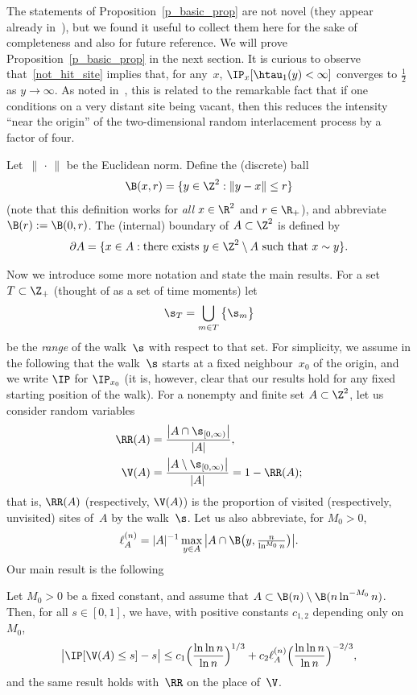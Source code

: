 The statements of Proposition~\ref{p_basic_prop} are not novel (they appear already in~\cite{CPV16}), but we found it useful to collect them here for the sake of completeness and also for future reference. We will prove Proposition~\ref{p_basic_prop} in the next section. It is curious to observe that~\eqref{not_hit_site} implies that, for any~$x$, $\IP_x[\htau_1(y)<\infty]$ converges to $\frac{1}{2}$ as $y\to \infty$. As noted in~\cite{CPV16}, this is related to the remarkable fact that if one conditions on a very distant site being vacant, then this reduces the intensity ``near the origin'' of the two-dimensional random interlacement process by a factor of four.

Let~$\|{\,\cdot\,}\|$ be the Euclidean norm. Define the (discrete) ball
\[
\B(x,r) = \{y\in \Z^2: \|y-x\|\leq r\}
\]
(note that this definition works for \emph{all} $x\in\R^2$ and $r\in\R_+$), and abbreviate $\B(r):=\B(0,r)$. The (internal) boundary of $A\subset\Z^2$ is defined by
\[
\partial A = \{x\in A: \text{there exists }y\in \Z^2\setminus A
\text{ such that }x\sim y\}.
\]

Now we introduce some more notation and state the main results. For a set $T\subset\Z_+$ (thought of as a set of time moments) let
\[
\s_T=\bigcup_{m\in T}\big\{\s_m\big\}
\]
be the \emph{range} of the walk~$\s$ with respect to that set. For simplicity, we assume in the following that the walk~$\s$ starts at a fixed neighbour~$x_0$ of the origin, and we write $\IP$ for $\IP_{x_0}$ (it is, however, clear that our results hold for any fixed starting position of the walk). For a nonempty and finite set $A\subset \Z^2$, let us consider random variables
\begin{align*}
\RR(A) &= \frac{\big|A\cap \s_{[0,\infty)}\big|}{|A|},\\
\V(A) &= \frac{\big|A\setminus \s_{[0,\infty)}\big|}{|A|} = 1-\RR(A);
\end{align*}
that is, $\RR(A)$ (respectively, $\V(A)$) is the proportion of visited (respectively, unvisited) sites of~$A$ by the walk~$\s$. Let us also abbreviate, for $M_0 > 0$,
\begin{equation}\label{df_ell_A}
\ell^{(n)}_A= |A|^{-1}
\max_{y\in A}
\big|A\cap \B\big(y,{\tfrac{n}{\ln^{M_0}n}}\big)\big|.
\end{equation}
Our main result is the following
\begin{theo}\label{t_main_res}
Let $M_0>0$ be a fixed constant, and assume that $A\subset \B(n)\setminus \B(n\ln^{-M_0}n)$. Then, for all $s\in [0,1]$, we have, with positive constants $c_{1,2}$ depending only on~$M_0$,
\begin{equation}\label{main_res}
\big|\IP[\V(A)\leq s] - s\big|
\leq c_1\Big(\frac{\ln\ln n}{\ln n}\Big)^{1/3} + c_2\ell^{(n)}_A \Big(\frac{\ln\ln n}{\ln n}\Big)^{-2/3},
\end{equation}
and the same result holds with~$\RR$ on the place of~$\V$.
\end{theo}

